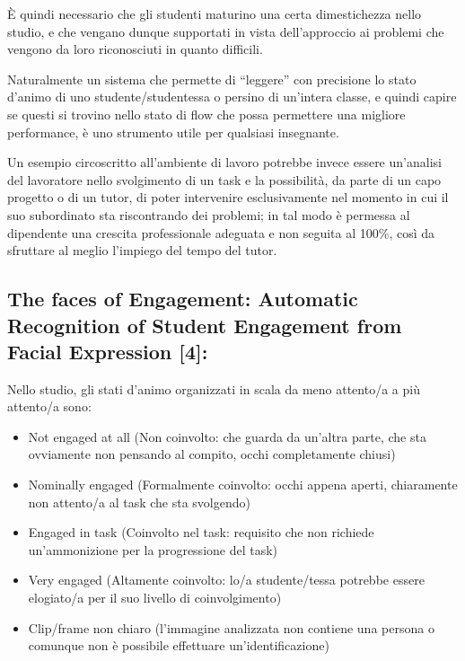 È quindi necessario che gli studenti maturino una certa dimestichezza nello studio, e che vengano dunque supportati in vista dell’approccio ai problemi che vengono da loro riconosciuti in quanto difficili.

Naturalmente un sistema che permette di “leggere” con precisione lo stato d’animo di uno studente/studentessa o persino di un’intera classe, e quindi capire se questi si trovino nello stato di flow che possa permettere una migliore performance, è uno strumento utile per qualsiasi insegnante.

Un esempio circoscritto all’ambiente di lavoro potrebbe invece essere un’analisi del lavoratore nello svolgimento di un task e la possibilità, da parte di un capo progetto o di un tutor, di poter intervenire esclusivamente nel momento in cui il suo subordinato sta riscontrando dei problemi; in tal modo è permessa al dipendente una crescita professionale adeguata e non seguita al 100\%, così da sfruttare al meglio l’impiego del tempo del tutor.

\subsection {The faces of Engagement: Automatic Recognition of Student Engagement from Facial Expression [4]:}

Nello studio, gli stati d’animo organizzati in scala da meno attento/a a più attento/a sono:
\begin{itemize}
    \item Not engaged at all (Non coinvolto: che guarda da un’altra parte, che sta ovviamente non pensando al compito, occhi completamente chiusi)
    \item Nominally engaged (Formalmente coinvolto: occhi appena aperti, chiaramente non attento/a al task che sta svolgendo)
    \item Engaged in task (Coinvolto nel task: requisito che non richiede un’ammonizione per la progressione del task)
    \item Very engaged (Altamente coinvolto: lo/a studente/tessa potrebbe essere elogiato/a per il suo livello di coinvolgimento)
    \item Clip/frame non chiaro (l’immagine analizzata non contiene una persona o comunque non è possibile effettuare un’identificazione)
\end{itemize}

